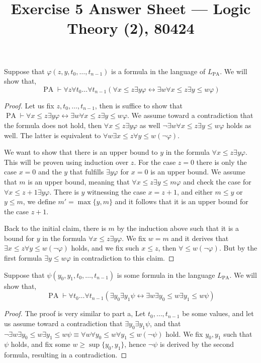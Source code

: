 
\title{Exercise 5 Answer Sheet --- Logic Theory (2), 80424}


\maketitle
\maketitleprint[yellow]

\question{}
\subquestion{}
Suppose that $\varphi(z, y, t_0, \ldots, t_{n - 1})$ is a formula in the language of $L_{\operatorname{PA}}$.
We will show that,
\[
	\operatorname{PA} \vdash \forall z \forall t_0 \ldots \forall t_{n - 1} (\forall x \le z \exists y \varphi \leftrightarrow \exists w \forall x \le z \exists y \le w \varphi)
\]
\begin{proof}
	Let us fix $z, t_0, \ldots, t_{n - 1}$, then is suffice to show that $\operatorname{PA} \vdash \forall x \le z \exists y \varphi \leftrightarrow \exists w \forall x \le z \exists y \le w \varphi$.
	We assume toward a contradiction that the formula does not hold, then $\forall x \le z \exists y \varphi$ as well $\lnot \exists w \forall x \le z \exists y \le w \varphi$ holds as well.
	The latter is equivalent to $\forall w \exists x \le z \forall y \le w (\lnot \varphi)$.

	We want to show that there is an upper bound to $y$ in the formula $\forall x \le z \exists y \varphi$.
	This will be proven using induction over $z$.
	For the case $z = 0$ there is only the case $x = 0$ and the $y$ that fulfills $\exists y \varphi$ for $x = 0$ is an upper bound.
	We assume that $m$ is an upper bound, meaning that $\forall x \le z \exists y \le m \varphi$ and check the case for $\forall x \le z + 1 \exists y \varphi$.
	There is $y$ witnessing the case $x = z + 1$, and either $m \le y$ or $y \le m$, we define $m' = \max\{y, m\}$ and it follows that it is an upper bound for the case $z + 1$.

	Back to the initial claim, there is $m$ by the induction above such that it is a bound for $y$ in the formula $\forall x \le z \exists y \varphi$.
	We fix $w = m$ and it derives that $\exists x \le z \forall y \le w (\lnot \varphi)$ holds, and we fix such $x \le z$, then $\forall \le w (\lnot \varphi)$.
	But by the first formula $\exists y \le w \varphi$ in contradiction to this claim.
\end{proof}

\subquestion{}
Suppose that $\psi(y_0, y_1, t_0, \ldots, t_{n - 1})$ is some formula in the language $L_{\operatorname{PA}}$.
We will show that,
\[
	\operatorname{PA}
	\vdash \forall t_0 \ldots \forall t_{n - 1} (\exists y_0 \exists y_1 \psi \leftrightarrow \exists w \exists y_0 \le w \exists y_1 \le w \psi)
\]
\begin{proof}
	The proof is very similar to part a,
	Let $t_0, \ldots, t_{n - 1}$ be some values, and let us assume toward a contradiction that $\exists y_0 \exists y_1 \psi$,
	and that $\lnot \exists w \exists y_0 \le w \exists y_1 \le w \psi \equiv \forall w \forall y_0 \le w \forall y_1 \le w (\lnot \psi)$ hold.
	We fix $y_0, y_1$ such that $\psi$ holds, and fix some $w \ge \sup\{ y_0, y_1 \}$, hence $\lnot \psi$ is derived by the second formula, resulting in a contradiction.
\end{proof}

